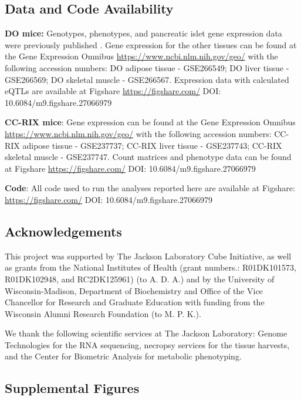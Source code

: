 \documentclass[
]{article}
\newcommand{\beginsupplement}{%
        \setcounter{table}{0}
        \renewcommand{\thetable}{S\arabic{table}}%
        \setcounter{figure}{0}
        \renewcommand{\thefigure}{S\arabic{figure}}%
     }
\begin{document}
\subsection{Data and Code
Availability}\label{data-and-code-availability}

\textbf{DO mice:} Genotypes, phenotypes, and pancreatic islet gene
expression data were previously published \cite{pmid29567659}. Gene
expression for the other tissues can be found at the Gene Expression
Omnibus \url{https://www.ncbi.nlm.nih.gov/geo/} with the following
accession numbers: DO adipose tissue - GSE266549; DO liver tissue -
GSE266569; DO skeletal muscle - GSE266567. Expression data with
calculated eQTLs are available at Figshare \url{https://figshare.com/}
DOI: 10.6084/m9.figshare.27066979

\textbf{CC-RIX mice}: Gene expression can be found at the Gene
Expression Omnibus \url{https://www.ncbi.nlm.nih.gov/geo/} with the
following accession numbers: CC-RIX adipose tissue - GSE237737; CC-RIX
liver tissue - GSE237743; CC-RIX skeletal muscle - GSE237747. Count
matrices and phenotype data can be found at Figshare
\url{https://figshare.com/} DOI: 10.6084/m9.figshare.27066979

\textbf{Code}: All code used to run the analyses reported here are
available at Figshare: \url{https://figshare.com/} DOI:
10.6084/m9.figshare.27066979

\subsection{Acknowledgements}\label{acknowledgements}

This project was supported by The Jackson Laboratory Cube Initiative, as
well as grants from the National Institutes of Health (grant numbers.:
R01DK101573, R01DK102948, and RC2DK125961) (to A. D. A.) and by the
University of Wisconsin-Madison, Department of Biochemistry and Office
of the Vice Chancellor for Research and Graduate Education with funding
from the Wisconsin Alumni Research Foundation (to M. P. K.).

We thank the following scientific services at The Jackson Laboratory:
Genome Technologies for the RNA sequencing, necropsy services for the
tissue harvests, and the Center for Biometric Analysis for metabolic
phenotyping.

\pagebreak
\beginsupplement

\subsection{Supplemental Figures}\label{supplemental-figures}
\end{document}
